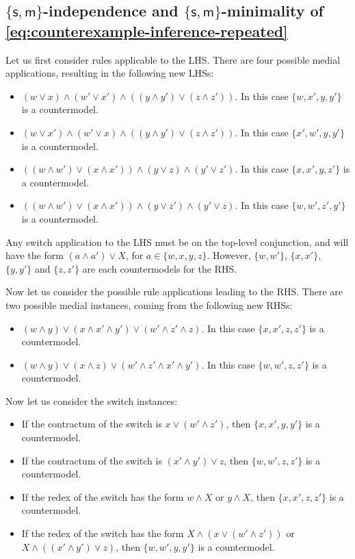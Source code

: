 \documentclass[a4paper, UKenglish, cleveref]{lipics-v2021}
\newcommand{\m}{\ensuremath{\mathsf{m}}}
\newcommand{\s}{\ensuremath{\mathsf{s}}}
\begin{document}
\subsection{$\{\s,\m \}$-independence and $\{\s,\m \}$-minimality of \cref{eq:counterexample-inference-repeated}}
\label{sec:ind-min-counterexample-inference}
Let us first consider rules applicable to the LHS.
There are four possible medial applications, resulting in the following new LHSs:
\begin{itemize}
\item $(w \lor x) \land (w' \lor x' ) \land ((y \land y') \lor (z \land z'))$. In this case $\{w,x',y,y' \}$ is a countermodel.
\item $(w \lor x') \land (w' \lor x) \land ((y \land y') \lor (z \land z'))$. In this case $\{x',w',y, y' \}$ is a countermodel.
\item $((w \land w') \lor (x \land x')) \land (y \lor z) \land (y' \lor z' )$. In this case $\{ x,x',y,z' \}$ is a countermodel.
\item $((w \land w') \lor (x \land x')) \land (y \lor z' ) \land (y' \lor z)$. In this case $\{ w,w',z', y'  \}$ is a countermodel.
\end{itemize}
Any switch application to the LHS must be on the top-level conjunction, and will have the form $(a \land a') \lor X$, for $a \in \{w,x,y,z \}$. However, $\{w,w' \}$, $\{x,x' \}$, $\{y,y' \}$ and $\{z,z'\}$ are each countermodels for the RHS.

Now let us consider the possible rule applications leading to the RHS.
There are two possible medial instances, coming from the following new RHSs:
\begin{itemize}
\item $(w \land y) \lor (x \land x' \land y') \lor (w' \land z' \land z)$. In this case $\{x,x',z,z'\}$ is a countermodel.
\item $(w \land y) \lor (x \land z) \lor (w' \land z' \land x' \land y')$. In this case $\{ w,w',z,z' \}$ is a countermodel.
\end{itemize}
Now let us consider the switch instances:
\begin{itemize}
\item If the contractum of the switch is $x \lor (w' \land z')$, then $\{x,x',y,y'\}$ is a countermodel.
\item If the contractum of the switch is $(x' \land y') \lor z$, then $\{w,w',z,z'\}$ is a countermodel.
\item If the redex of the switch has the form $w \land X$ or $y \land X$, then $\{x,x',z,z'\}$ is a countermodel.
\item If the redex of the switch has the form $X \land (x \lor (w' \land z'))$ or $X \land ((x' \land y') \lor z)$, then $\{ w,w',y,y' \}$ is a countermodel.
\end{itemize}
\end{document}
